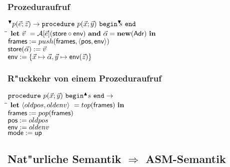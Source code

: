 \documentclass[german,10pt, a4paper, twocolumn]{scrartcl}
\theoremstyle{definition}
\theoremstyle{remark}
\begin{document}
\subsubsection{Prozeduraufruf}
\small
\begin{tabbing}
  $^{\blacktriangledown}p(\vec{e};\vec{z})\rightarrow \mbox{\tt procedure}\ p(\vec{x};\vec{y})\ \mbox{\tt begin} ^{\blacktriangledown}\!\!s\ \mbox{\tt end}$\\
  \qquad \= \quad \= \kill
  \>	$\mbox{\textbf{let}}\ \vec{v}\ = \mathcal{A}[\vec{e}](\mbox{\sffamily store}\circ\mbox{\sffamily env})\ \mbox{\textbf{and}}\ \vec{\alpha} = \mbox{\textbf{new}}(\mbox{\sffamily Adr})\ \mbox{\textbf{in}}$\\
  \> \>		$\mbox{\sffamily frames} := push(\mbox{\sffamily frames},\langle \mbox{\sffamily pos},\mbox{\sffamily env} \rangle)$\\
  \> \>		$\mbox{\sffamily store}(\vec{\alpha}):= \vec{v}$\\
  \> \>		$\mbox{\sffamily env} := \{\vec{x} \mapsto \vec{\alpha}, \vec{y} \mapsto \mbox{\sffamily env}(\vec{z})\}$
\end{tabbing}
\normalsize

\subsubsection{R"uckkehr von einem Prozeduraufruf}
\small
\begin{tabbing}
  $\mbox{\tt procedure}\ p(\vec{x};\vec{y})\ \mbox{\tt begin} ^{\blacktriangle}s\ \mbox{\tt end}\rightarrow$\\
  \qquad \= \quad \= \kill
  \>	$\mbox{\textbf{let}}\ \langle oldpos, oldenv\rangle\ = top(\mbox{\sffamily frames})\ \mbox{\textbf{in}}$\\
  \> \>		$\mbox{\sffamily frames} := pop(\mbox{\sffamily frames})$\\
  \> \>		$\mbox{\sffamily pos} := oldpos$\\
  \> \>		$\mbox{\sffamily env} := oldenv$\\
  \> \>		$\mbox{\sffamily mode} := \mbox{\sffamily up}$
\end{tabbing}
\normalsize

\subsection{Nat"urliche Semantik $\Rightarrow$ ASM-Semantik}
\end{document}

